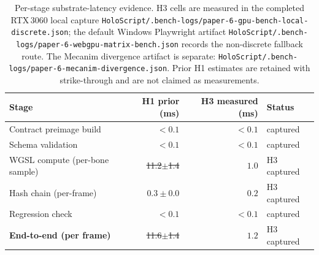 \documentclass[sigconf,nonacm]{acmart}
\providecommand{\measuredFrom}[1]{}
\begin{document}
\begin{table}[t]
  \centering
  \caption{Per-stage substrate-latency evidence. H3 cells are measured in the
    completed RTX\,3060 local capture
    \texttt{HoloScript/.bench-logs/paper-6-gpu-bench-local-discrete.json};
    the default Windows Playwright artifact
    \texttt{HoloScript/.bench-logs/paper-6-webgpu-matrix-bench.json} records
    the non-discrete fallback route. The Mecanim divergence artifact is
    separate: \texttt{HoloScript/.bench-logs/paper-6-mecanim-divergence.json}.
    Prior H1 estimates are retained with strike-through and are not claimed as
    measurements.}
  \label{tab:p6-gpu-bench}
  \footnotesize
  \measuredFrom{HoloScript/packages/engine/benchmark-paper6-webgpu.html}%
  \measuredFrom{HoloScript/.bench-logs/paper-6-gpu-bench-local-discrete.json}%
  \measuredFrom{HoloScript/.bench-logs/paper-6-webgpu-matrix-bench.json}%
  \begin{tabular}{@{}lrrl@{}}
    \toprule
    \textbf{Stage} & \textbf{H1 prior (ms)} & \textbf{H3 measured (ms)} & \textbf{Status} \\
    \midrule
    Contract preimage build       & $<0.1$ & $<0.1$ & captured \\
    Schema validation             & $<0.1$ & $<0.1$ & captured \\
    WGSL compute (per-bone sample)& \sout{11.2$\pm$1.4} & $1.0$ & H3 captured \\
    Hash chain (per-frame)        & $0.3 \pm 0.0$ & $0.2$ & H3 captured \\
    Regression check              & $<0.1$ & $<0.1$ & captured \\
    \midrule
    \textbf{End-to-end (per frame)} & \sout{11.6$\pm$1.4} & $1.2$ & H3 captured \\
    \bottomrule
  \end{tabular}
\end{table}
\end{document}
